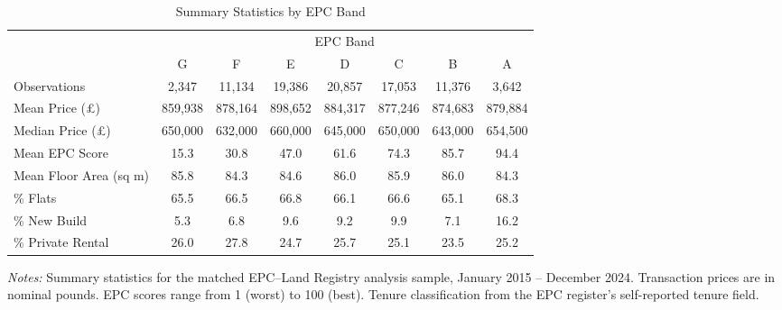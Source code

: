 \begin{table}[htbp]
\centering
\caption{Summary Statistics by EPC Band}
\label{tab:summary}
\begin{adjustbox}{max width=\textwidth}
\begin{tabular}{lccccccc}
\toprule
 & \multicolumn{7}{c}{EPC Band} \\
\cmidrule(lr){2-8}
 & G & F & E & D & C & B & A \\
\midrule
Observations & 2,347 & 11,134 & 19,386 & 20,857 & 17,053 & 11,376 & 3,642 \\
Mean Price (\pounds) & 859,938 & 878,164 & 898,652 & 884,317 & 877,246 & 874,683 & 879,884 \\
Median Price (\pounds) & 650,000 & 632,000 & 660,000 & 645,000 & 650,000 & 643,000 & 654,500 \\
Mean EPC Score & 15.3 & 30.8 & 47.0 & 61.6 & 74.3 & 85.7 & 94.4 \\
Mean Floor Area (sq m) & 85.8 & 84.3 & 84.6 & 86.0 & 85.9 & 86.0 & 84.3 \\
\% Flats & 65.5 & 66.5 & 66.8 & 66.1 & 66.6 & 65.1 & 68.3 \\
\% New Build & 5.3 & 6.8 & 9.6 & 9.2 & 9.9 & 7.1 & 16.2 \\
\% Private Rental & 26.0 & 27.8 & 24.7 & 25.7 & 25.1 & 23.5 & 25.2 \\
\bottomrule
\end{tabular}
\end{adjustbox}
\begin{minipage}{\textwidth}
\footnotesize
\textit{Notes:} Summary statistics for the matched EPC--Land Registry analysis sample, January 2015 -- December 2024.
Transaction prices are in nominal pounds. EPC scores range from 1 (worst) to 100 (best).
Tenure classification from the EPC register's self-reported tenure field.
\end{minipage}
\end{table}
